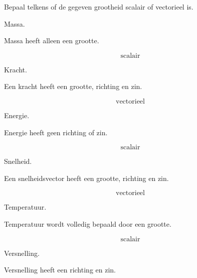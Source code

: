 \documentclass{ximera}
\begin{document}
\begin{oefening}{\oefB\ESS}

Bepaal telkens of de gegeven grootheid scalair of vectorieel is.

\begin{question}
Massa.

\begin{oplossing}
Massa heeft alleen een grootte.

\[
\boxed{\text{scalair}}
\]
\end{oplossing}
\end{question}


\begin{question}
Kracht.

\begin{oplossing}
Een kracht heeft een grootte, richting en zin.

\[
\boxed{\text{vectorieel}}
\]
\end{oplossing}
\end{question}


\begin{question}
Energie.

\begin{oplossing}
Energie heeft geen richting of zin.

\[
\boxed{\text{scalair}}
\]
\end{oplossing}
\end{question}


\begin{question}
Snelheid.

\begin{oplossing}
Een snelheidsvector heeft een grootte, richting en zin.

\[
\boxed{\text{vectorieel}}
\]
\end{oplossing}
\end{question}


\begin{question}
Temperatuur.

\begin{oplossing}
Temperatuur wordt volledig bepaald door een grootte.

\[
\boxed{\text{scalair}}
\]
\end{oplossing}
\end{question}


\begin{question}
Versnelling.

\begin{oplossing}
Versnelling heeft een richting en zin.


\end{oplossing}
\end{question}
\end{oefening}
\end{document}
